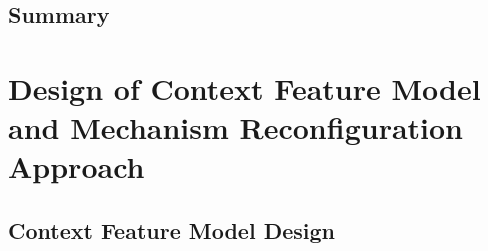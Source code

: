 \section{Summary}



\chapter{Design of Context Feature Model and Mechanism Reconfiguration Approach}



\section{Context Feature Model Design}
